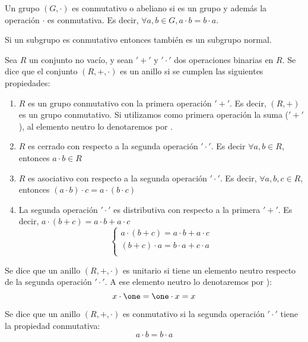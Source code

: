 \begin{defn}
Un grupo $(G,\cdot)$ es conmutativo o abeliano si es un grupo y además la operación $\cdot$ es conmutativa. Es decir, $\forall a,b \in G, a\cdot b = b \cdot a$.
\end{defn}

\obs Si un subgrupo es conmutativo entonces también es un subgrupo normal.

\begin{defn}[Anillo]
Sea $R$ un conjunto no vacío, y sean $'+'$ y $'\cdot'$ dos operaciones binarias en $R$. Se dice que el conjunto $(R, +, \cdot )$ es un anillo si se cumplen las siguientes propiedades:

\begin{enumerate}
	\item $R$ es un grupo conmutativo con la primera operación $'+'$. Es decir, $(R,+)$ es un grupo conmutativo. Si utilizamos como primera operación la suma ($'+'$), al elemento neutro lo denotaremos por \zero.
	\item $R$ es cerrado con respecto a la segunda operación $'\cdot'$. Es decir $\forall a,b \in R$, entonces $a \cdot b \in R$
	\item $R$ es asociativo con respecto a la segunda operación $'\cdot'$. Es decir, $\forall a,b,c \in R$, entonces $(a\cdot b) \cdot c = a \cdot (b \cdot c)$
	\item La segunda operación $'\cdot'$ es distributiva con respecto a la primera $'+'$. Es decir, $a \cdot (b+c) = a\cdot b + a \cdot c$
	\[
	\left\{ \begin{array}{c}
	a \cdot (b+c) = a\cdot b + a \cdot c \\
	(b+c) \cdot a = b\cdot a + c\cdot a \\
	\end{array}
	\right.
	\]
\end{enumerate}
\end{defn}


\begin{defn}
	Se dice que un anillo $(R, +, \cdot)$ es unitario si tiene un elemento neutro respecto de la segunda operación $'\cdot'$. A ese elemento neutro lo denotaremos por \one):
	\[ x\cdot \one = \one \cdot x = x \]
\end{defn}

\begin{defn}
Se dice que un anillo $(R, +, \cdot)$ es conmutativo si la segunda operación $'\cdot'$ tiene la propiedad conmutativa:
\[ a\cdot b = b\cdot a \]
\end{defn}


